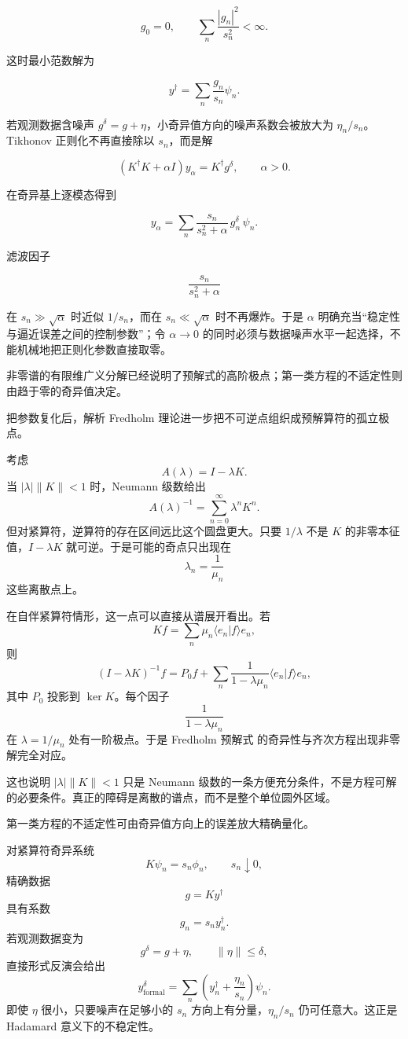 \begin{equation*}{
g_0=0,
\qquad
\sum_n\frac{|g_n|^2}{s_n^2}<\infty
}.\end{equation*}

这时最小范数解为

\[
y^\dagger=\sum_n\frac{g_n}{s_n}\psi_n.
\]

若观测数据含噪声 $g^\delta=g+\eta$，小奇异值方向的噪声系数会被放大为 $\eta_n/s_n$。Tikhonov 正则化不再直接除以 $s_n$，而是解

\[
(K^\dagger K+\alpha I)y_\alpha=K^\dagger g^\delta,
\qquad \alpha>0.
\]

在奇异基上逐模态得到

\[
{
y_\alpha
=\sum_n\frac{s_n}{s_n^2+\alpha}\,g_n^\delta\,\psi_n
}.
\]

滤波因子

\[
\frac{s_n}{s_n^2+\alpha}
\]

在 $s_n\gg\sqrt\alpha$ 时近似 $1/s_n$，而在 $s_n\ll\sqrt\alpha$ 时不再爆炸。于是 $\alpha$ 明确充当``稳定性与逼近误差之间的控制参数''；令 $\alpha\to0$ 的同时必须与数据噪声水平一起选择，不能机械地把正则化参数直接取零。

非零谱的有限维广义分解已经说明了预解式的高阶极点；第一类方程的不适定性则由趋于零的奇异值决定。

把参数复化后，解析 Fredholm 理论进一步把不可逆点组织成预解算符的孤立极点。

考虑
\[
A(\lambda)=I-\lambda K.
\]
当 $|\lambda|\|K\|<1$ 时，Neumann 级数给出
\[
A(\lambda)^{-1}
=\sum_{n=0}^{\infty}\lambda^nK^n.
\]
但对紧算符，逆算符的存在区间远比这个圆盘更大。只要 $1/\lambda$ 不是 $K$ 的非零本征值，$I-\lambda K$ 就可逆。于是可能的奇点只出现在
\[
\lambda_n=\frac1{\mu_n}
\]
这些离散点上。

在自伴紧算符情形，这一点可以直接从谱展开看出。若
\[
Kf=\sum_n\mu_n\langle e_n|f\rangle e_n,
\]
则
\begin{equation*}{
(I-\lambda K)^{-1}f
=P_0f+
\sum_n\frac{1}{1-\lambda\mu_n}
\langle e_n|f\rangle e_n
},\end{equation*}
其中 $P_0$ 投影到 $\ker K$。每个因子
\[
\frac1{1-\lambda\mu_n}
\]
在 $\lambda=1/\mu_n$ 处有一阶极点。于是 Fredholm 预解式 的奇异性与齐次方程出现非零解完全对应。

这也说明 $|\lambda|\|K\|<1$ 只是 Neumann 级数的一条方便充分条件，不是方程可解的必要条件。真正的障碍是离散的谱点，而不是整个单位圆外区域。

第一类方程的不适定性可由奇异值方向上的误差放大精确量化。

对紧算符奇异系统
\[
K\psi_n=s_n\phi_n,
\qquad s_n\downarrow0,
\]
精确数据
\[
g=Ky^\dagger
\]
具有系数
\[
g_n=s_n y_n^\dagger.
\]
若观测数据变为
\[
g^\delta=g+\eta,
\qquad \|\eta\|\le\delta,
\]
直接形式反演会给出
\[
y_{\mathrm{formal}}^\delta
=\sum_n\left(y_n^\dagger+\frac{\eta_n}{s_n}\right)\psi_n.
\]
即使 $\eta$ 很小，只要噪声在足够小的 $s_n$ 方向上有分量，$\eta_n/s_n$ 仍可任意大。这正是 Hadamard 意义下的不稳定性。

